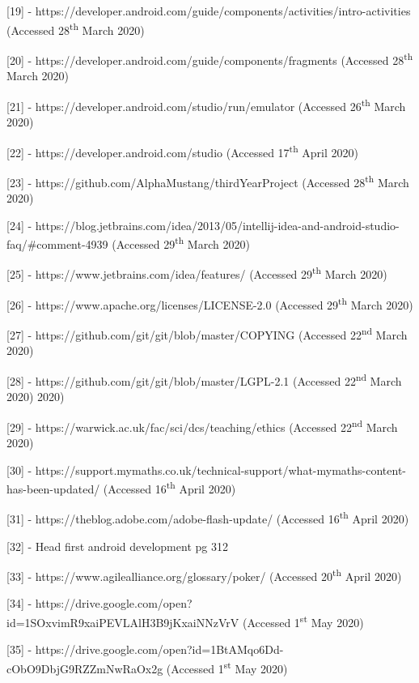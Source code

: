 \documentclass{article}
\begin{document}
[19] - https://developer.android.com/guide/components/activities/intro-activities (Accessed 28\textsuperscript{th} March 2020) \par

[20] - https://developer.android.com/guide/components/fragments (Accessed 28\textsuperscript{th} March 2020) \par

[21] - https://developer.android.com/studio/run/emulator (Accessed 26\textsuperscript{th} March 2020) \par

[22] - https://developer.android.com/studio (Accessed 17\textsuperscript{th} April 2020) \par

[23] - https://github.com/AlphaMustang/thirdYearProject (Accessed 28\textsuperscript{th} March 2020) \par

[24] - https://blog.jetbrains.com/idea/2013/05/intellij-idea-and-android-studio-faq/\#comment-4939 (Accessed 29\textsuperscript{th} March 2020) \par

[25] - https://www.jetbrains.com/idea/features/ (Accessed 29\textsuperscript{th} March 2020) \par

[26] - https://www.apache.org/licenses/LICENSE-2.0 (Accessed 29\textsuperscript{th} March 2020) \par

[27] - https://github.com/git/git/blob/master/COPYING (Accessed 22\textsuperscript{nd} March 2020) \par

[28] - https://github.com/git/git/blob/master/LGPL-2.1 (Accessed 22\textsuperscript{nd} March 2020) 2020) \par

[29] - https://warwick.ac.uk/fac/sci/dcs/teaching/ethics (Accessed 22\textsuperscript{nd} March 2020) \par

[30] - https://support.mymaths.co.uk/technical-support/what-mymaths-content-has-been-updated/ (Accessed 16\textsuperscript{th} April 2020) \par

[31] - https://theblog.adobe.com/adobe-flash-update/ (Accessed 16\textsuperscript{th} April 2020) \par

[32] - Head first android development pg 312 \par

[33] - https://www.agilealliance.org/glossary/poker/ (Accessed 20\textsuperscript{th} April 2020) \par

[34] - https://drive.google.com/open?id=1SOxvimR9xaiPEVLAlH3B9jKxaiNNzVrV (Accessed 1\textsuperscript{st} May 2020) \par

[35] - https://drive.google.com/open?id=1BtAMqo6Dd-cObO9DbjG9RZZmNwRaOx2g (Accessed 1\textsuperscript{st} May 2020)
\end{document}
